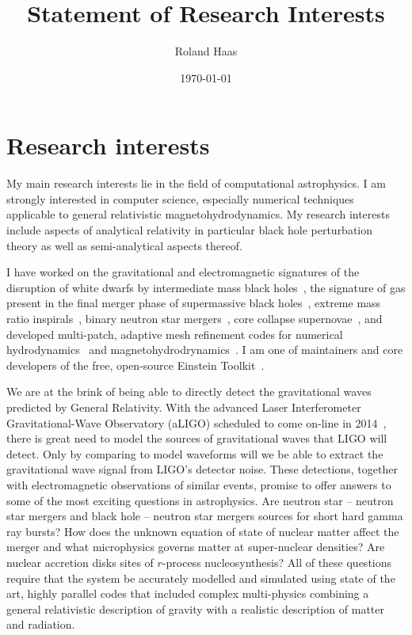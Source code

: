 \documentclass[12pt]{article}
\newcommand{\aligo}{aLIGO}
\newcommand{\ligo}{LIGO}
\begin{document}
\title{Statement of Research Interests}
\author{Roland Haas}
\date{\today}
\maketitle

\section{Research interests}
My main research interests lie in the field of computational astrophysics.
I am strongly interested in computer science,
especially numerical techniques applicable to general relativistic
magnetohydrodynamics. 
My research interests
include aspects of analytical
relativity in particular black hole perturbation theory as well as
semi-analytical aspects thereof. 

I have worked on the gravitational and electromagnetic signatures of the
disruption of white dwarfs by intermediate mass black
holes~\cite{2012arXiv1212.4837S, 2012ApJ...749..117H},
the signature of gas present in the final merger phase of
supermassive black holes~\cite{2012ApJ...744...45B,2010ApJ...715.1117B}, extreme mass ratio
inspirals~\cite{2011arXiv1112.3707H,2007PhRvD..75l4011H,2006PhRvD..74d4009H,2005CQGra..22S.739H,2013PhRvD..87d1501Z},
binary neutron star mergers~\cite{Haas:nsns}, core
collapse supernovae~\cite{2012arXiv1210.6674O,2012PhRvD..86b4026O}, 
and developed multi-patch, adaptive mesh
refinement codes for
numerical hydrodynamics~\cite{2012arXiv1212.1191R} and
magnetohydrodrynamics~\cite{2013arXiv1304.5544M}. I am one of maintainers and
core developers of the free, open-source Einstein
Toolkit~\cite{2012CQGra..29k5001L}.

We are at the brink of being able to directly detect the gravitational waves
predicted by General Relativity. With the advanced Laser Interferometer
Gravitational-Wave Observatory (\aligo{}) scheduled to come
on-line in 2014~\cite{advLIGO:Web}, there is great need to model the sources of
gravitational waves that \ligo{} will detect. 
Only by comparing to model waveforms will we be able to extract the
gravitational wave signal from \ligo{'s} detector noise.
These detections, together with
electromagnetic observations of similar events, promise to offer answers to
some of the most exciting questions in astrophysics. Are neutron star --
neutron star mergers and black hole -- neutron star mergers sources for short
hard gamma ray bursts?  How does the unknown equation of state of nuclear
matter affect the merger and what microphysics governs matter at
super-nuclear densities? Are nuclear accretion disks sites of $r$-process
nucleosynthesis? All of these questions require that the system be accurately
modelled and simulated using state of the art, highly parallel codes that
included complex multi-physics combining a general relativistic description of
gravity with a realistic description of matter and radiation. 
\end{document}
